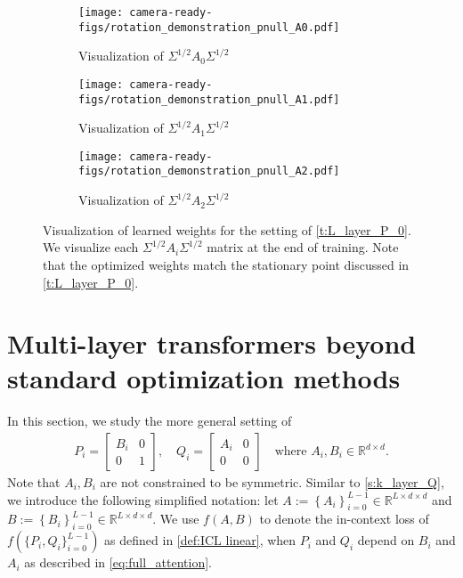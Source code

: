 \documentclass{article}
\newcommand{\R}{\mathbb{R}}
\newcommand*\lrbb[1]{\left\{ #1 \right\}}
\begin{document}
\begin{figure}
\begin{subfigure}[b]{0.32\textwidth}
\centering
\texttt{[image: camera-ready-figs/rotation\_demonstration\_pnull\_A0.pdf]}
\caption{Visualization of $\Sigma^{1/2} A_0 \Sigma^{1/2}$} 
\label{fig:A0_imshow_pnull}
\end{subfigure}
\begin{subfigure}[b]{0.32\textwidth}
\centering
\texttt{[image: camera-ready-figs/rotation\_demonstration\_pnull\_A1.pdf]}
\caption{Visualization of $\Sigma^{1/2} A_1 \Sigma^{1/2}$} 
\label{fig:A1_imshow_pnull}
\end{subfigure}
\begin{subfigure}[b]{0.32\textwidth}
\centering
\texttt{[image: camera-ready-figs/rotation\_demonstration\_pnull\_A2.pdf]}
\caption{Visualization of $\Sigma^{1/2} A_2 \Sigma^{1/2}$} 
\label{fig:A2_imshow_pnull}
\end{subfigure} 
\caption{Visualization of learned weights  for the setting of \autoref{t:L_layer_P_0}. We visualize each $\Sigma^{1/2} A_i \Sigma^{1/2}$ matrix at the end of training.
Note that the optimized weights match the stationary point discussed in \autoref{t:L_layer_P_0}.}
\label{fig:pnull_imshow}
\end{figure}




\section{Multi-layer transformers beyond standard optimization methods}
\label{s:k_layer_PQ}
In this section, we study the more general setting of
\begin{align}\label{eq:full_attention}
P_i = \begin{bmatrix}
B_i & 0 \\ 
0 & 1
\end{bmatrix}, \quad Q_i = \begin{bmatrix}
A_i & 0 \\ 
0 & 0
\end{bmatrix}   \quad \text{where $A_i, B_i \in \R^{d\times d}$.}
\end{align}
Note that $A_i, B_i$ are not constrained to be symmetric.
Similar to \autoref{s:k_layer_Q}, we introduce the following simplified notation: let $A := \lrbb{A_i}_{i=0}^{L-1} \in \R^{L \times d \times d}$ and $B := \lrbb{B_i}_{i=0}^{L-1} \in \R^{L \times d \times d}$. We use $f(A,B)$ to denote the in-context loss of $f\left(\{P_i, Q_i\}^{L-1}_{i=0}\right)$ as defined in \eqref{def:ICL linear}, when $P_i$ and $Q_i$ depend on $B_i$ and $A_i$ as described in \eqref{eq:full_attention}.
\end{document}
